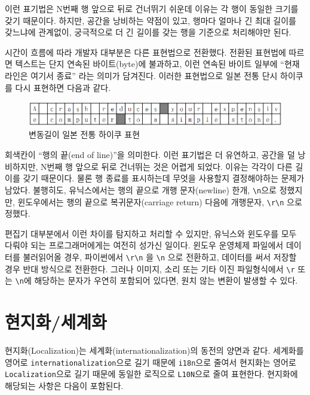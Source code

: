\documentclass[
  letterpaper,
]{book}
\begin{document}
이런 표기법은 N번째 행 앞으로 뒤로 건너뛰기 쉬운데 이유는 각 행이 동일한
크기를 갖기 때문이다. 하지만, 공간을 낭비하는 약점이 있고, 행마다 얼마나
긴 최대 길이를 갖느냐에 관계없이, 궁극적으로 더 긴 길이를 갖는 행을
기준으로 처리해야만 된다.

시간이 흐름에 따라 개발자 대부분은 다른 표현법으로 전환했다. 전환된
표현법에 따르면 텍스트는 단지 연속된 바이트(byte)에 불과하고, 이런
연속된 바이트 일부에 ``현재 라인은 여기서 종료'' 라는 의미가 담겨진다.
이러한 표현법으로 일본 전통 단시 하이쿠를 다시 표현하면 다음과 같다.

\begin{figure}

{\centering \includegraphics{images/regex-encoding-variable-width.png}

}

\caption{변동길이 일본 전통 하이쿠 표현}

\end{figure}

회색칸이 ``행의 끝(end of line)''을 의미한다. 이런 표기법은 더 유연하고,
공간을 덜 낭비하지만, N번째 행 앞으로 뒤로 건너뛰는 것은 어렵게 되었다.
이유는 각각이 다른 길이를 갖기 때문이다. 물론 행 종료를 표시하는데
무엇을 사용할지 결정해야하는 문제가 남았다. 불행히도, 유닉스에서는 행의
끝으로 개행 문자(newline) 한개, \texttt{\textbackslash{}n}으로 정했지만,
윈도우에서는 행의 끝으로 복귀문자(carriage return) 다음에 개행문자,
\texttt{\textbackslash{}r\textbackslash{}n} 으로 정했다.

편집기 대부분에서 이런 차이를 탐지하고 처리할 수 있지만, 유닉스와
윈도우를 모두 다뤄야 되는 프로그래머에게는 여전히 성가신 일이다. 윈도우
운영체제 파일에서 데이터를 불러읽어올 경우, 파이썬에서
\texttt{\textbackslash{}r\textbackslash{}n} 을
\texttt{\textbackslash{}n} 으로 전환하고, 데이터를 써서 저장할 경우 반대
방식으로 전환한다. 그러나 이미지, 소리 또는 기타 이진 파일형식에서
\texttt{\textbackslash{}r} 또는 \texttt{\textbackslash{}n}에 해당하는
문자가 우연히 포함되어 있다면, 원치 않는 변환이 발생할 수 있다.

\hypertarget{localization}{%
\section{현지화/세계화}\label{localization}}

현지화(Localization)는 세계화(internationalization)의 동전의 양면과
같다. 세계화를 영어로 \texttt{internationalization}으로 길기 때문에
\texttt{i18n}으로 줄여서 현지화는 영어로 \texttt{Localization}으로 길기
때문에 동일한 로직으로 \texttt{L10N}으로 줄여 표현한다. 현지화에
해당되는 사항은 다음이 포함된다.
\autocite{oliver2023internationalization}
\end{document}
